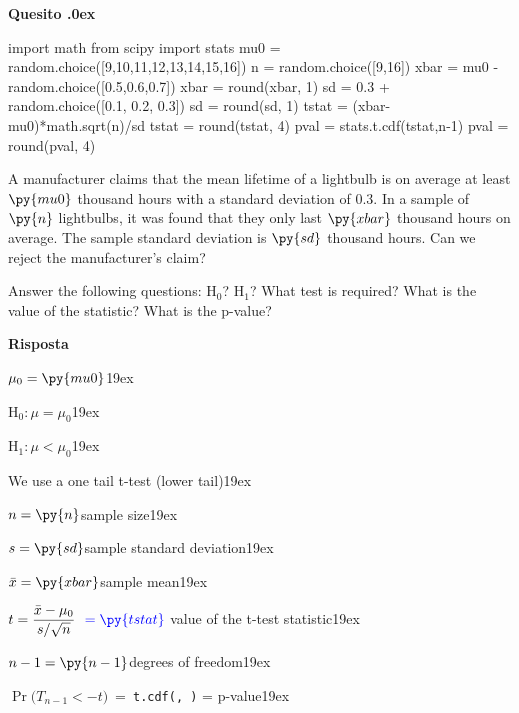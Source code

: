 \documentclass[11pt,twoside,a4paper]{article}
\newcounter{quesito}
\newenvironment{question}{\bigskip\addtocounter{quesito}{1}\bigskip\bigskip\par\textbf{Quesito \thequesito.\kern0ex}}{\par\vspace{\parskip}}
\newenvironment{answer}{\par\textbf{Risposta\quad}}{\par\vspace{\parskip}}
\begin{document}
\clearpage
\begin{question}
\begin{pycode}
import math
from scipy import stats
mu0 = random.choice([9,10,11,12,13,14,15,16])
n = random.choice([9,16])
xbar = mu0 - random.choice([0.5,0.6,0.7])
xbar = round(xbar, 1)
sd = 0.3 + random.choice([0.1, 0.2, 0.3])
sd = round(sd, 1)
tstat = (xbar-mu0)*math.sqrt(n)/sd
tstat = round(tstat, 4)
pval = stats.t.cdf(tstat,n-1)
pval = round(pval, 4)
\end{pycode}
A manufacturer claims that the mean lifetime of a lightbulb is on average at least $\py{mu0}$ thousand  hours with a standard deviation of $0.3$. In a sample of $\py{n}$ lightbulbs, it was found that they only last $\py{xbar}$ thousand hours on average. The sample standard deviation is $\py{sd}$ thousand hours. Can we reject the manufacturer's claim? 

Answer the following questions: H$_0$? H$_1$? What test is required? What is the value of the statistic? What is the p-value? 

\begin{answer}\parskip5pt

  $\mu_0 = \py{mu0}$\kern19ex

  {\color{blue}H$_0:$\hfill $\mu = \mu_0$}\kern19ex
  
  {\color{blue}H$_1:$\hfill $\mu<\mu_0$}\kern19ex
  
  We use a one tail t-test (lower tail)\kern19ex
  
  $n = \py{n}$\hfill sample size\kern19ex
  
  $s = \py{sd}$\hfill sample standard deviation\kern19ex
  
  $\bar{x} = \py{xbar}$\hfill sample mean\kern19ex
  
  $t = \displaystyle\frac{\bar{x}-\mu_0}{s/\sqrt{n}}\  {\color{blue}\ = \py{tstat}}$\hfill{\color{blue} value of the t-test statistic}\kern19ex
  
  $n-1 = \py{n-1}$\hfill degrees of freedom\kern19ex
  
  $\Pr\big(T_{n-1}<-t\big)\  =\ ${\color{blue}\tt t.cdf(,\ )} = \hfill{\color{blue} p-value}\kern19ex

\end{answer}
\end{question}
\end{document}
